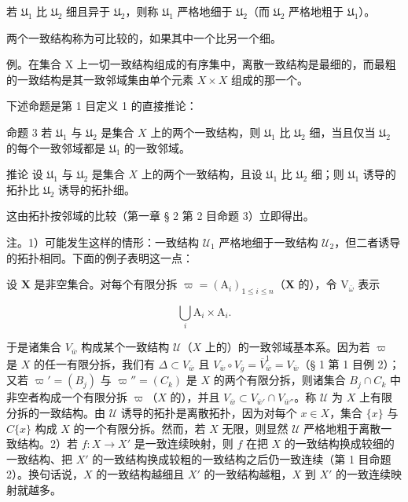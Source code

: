 若 \(\mathfrak{U}_1\) 比 \(\mathfrak{U}_2\) 细且异于 \(\mathfrak{U}_2\)，则称 \(\mathfrak{U}_1\) 严格地细于 \(\mathfrak{U}_2\)（而 \(\mathfrak{U}_2\) 严格地粗于 \(\mathfrak{U}_1\)）。

两个一致结构称为可比较的，如果其中一个比另一个细。

例。在集合 X 上一切一致结构组成的有序集中，离散一致结构是最细的，而最粗的一致结构是其一致邻域集由单个元素 \(X \times X\) 组成的那一个。

下述命题是第 1 目定义 1 的直接推论：

命题 3 若 \(\mathfrak{U}_1\) 与 \(\mathfrak{U}_2\) 是集合 \(X\) 上的两个一致结构，则 \(\mathfrak{U}_1\) 比 \(\mathfrak{U}_2\) 细，当且仅当 \(\mathfrak{U}_2\) 的每个一致邻域都是 \(\mathfrak{U}_1\) 的一致邻域。

推论 设 \(\mathfrak{U}_1\) 与 \(\mathfrak{U}_2\) 是集合 \(X\) 上的两个一致结构，且设 \(\mathfrak{U}_1\) 比 \(\mathfrak{U}_2\) 细；则 \(\mathfrak{U}_1\) 诱导的拓扑比 \(\mathfrak{U}_2\) 诱导的拓扑细。

这由拓扑按邻域的比较（第一章 § 2 第 2 目命题 3）立即得出。

注。1）可能发生这样的情形：一致结构 \(\mathcal{U}_1\) 严格地细于一致结构 \(\mathcal{U}_2\)，但二者诱导的拓扑相同。下面的例子表明这一点：

设 \(\mathbf{X}\) 是非空集合。对每个有限分拆 \(\varpi = (\mathrm{A}_i)_{1\leqslant i\leqslant n}\)（\(\mathbf{X}\) 的），令 \(\mathrm{V}_{\overline{\omega}}\) 表示

\[
\bigcup_ {i} \mathrm{A} _ {i} \times \mathrm{A} _ {i}.
\]

于是诸集合 \(V_{\overline{w}}\) 构成某个一致结构 \(\mathcal{U}\)（\(X\) 上的）的一致邻域基本系。因为若 \(\varpi\) 是 \(X\) 的任一有限分拆，我们有 \(\Delta \subset V_{\overline{w}}\) 且 \(V_{\overline{w}} \circ V_{\overline{g}} = \overline{V}_{\overline{w}}^{1} = V_{\overline{w}}\)（§ 1 第 1 目例 2）；又若 \(\varpi' = (B_j)\) 与 \(\varpi'' = (C_k)\) 是 \(X\) 的两个有限分拆，则诸集合 \(B_j \cap C_k\) 中非空者构成一个有限分拆 \(\varpi\)（\(X\) 的），并且 \(V_{\overline{w}} \subset V_{\overline{w}'} \cap V_{\overline{w}''}\)。称 \(\mathcal{U}\) 为 \(X\) 上有限分拆的一致结构。由 \(\mathcal{U}\) 诱导的拓扑是离散拓扑，因为对每个 \(x \in X\)，集合 \(\{x\}\) 与 \(C\{x\}\) 构成 \(X\) 的一个有限分拆。然而，若 \(X\) 无限，则显然 \(\mathcal{U}\) 严格地粗于离散一致结构。2）若 \(f: X \to X'\) 是一致连续映射，则 \(f\) 在把 \(X\) 的一致结构换成较细的一致结构、把 \(X'\) 的一致结构换成较粗的一致结构之后仍一致连续（第 1 目命题 2）。换句话说，\(X\) 的一致结构越细且 \(X'\) 的一致结构越粗，\(X\) 到 \(X'\) 的一致连续映射就越多。


